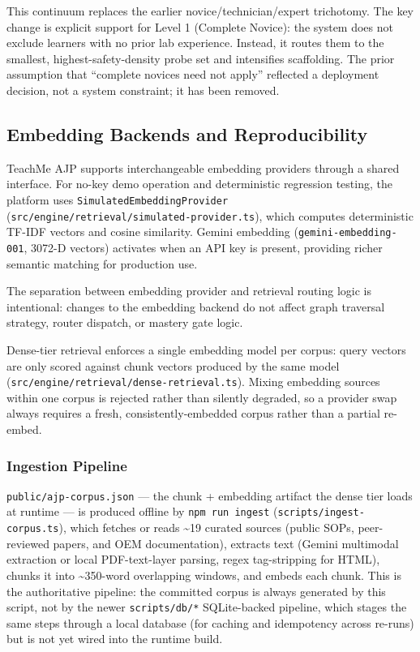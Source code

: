 \documentclass[10pt,letterpaper,twocolumn]{article}
\newcommand{\code}[1]{\texttt{\small #1}}
\begin{document}
This continuum replaces the earlier novice/technician/expert trichotomy. The key change is explicit support for Level 1 (Complete Novice): the system does not exclude learners with no prior lab experience. Instead, it routes them to the smallest, highest-safety-density probe set and intensifies scaffolding. The prior assumption that ``complete novices need not apply'' reflected a deployment decision, not a system constraint; it has been removed.

\subsection{Embedding Backends and Reproducibility}
\label{sec:embedding-backends}

TeachMe AJP supports interchangeable embedding providers through a shared interface. For no-key demo operation and deterministic regression testing, the platform uses \code{SimulatedEmbeddingProvider} (\code{src/\linebreak[0]engine/\linebreak[0]retrieval/\linebreak[0]simulated-provider.ts}), which computes deterministic TF-IDF vectors and cosine similarity. Gemini embedding (\code{gemini-embedding-001}, 3072-D vectors) activates when an API key is present, providing richer semantic matching for production use.

The separation between embedding provider and retrieval routing logic is intentional: changes to the embedding backend do not affect graph traversal strategy, router dispatch, or mastery gate logic.

Dense-tier retrieval enforces a single embedding model per corpus: query vectors are only scored against chunk vectors produced by the same model (\code{src/\linebreak[0]engine/\linebreak[0]retrieval/\linebreak[0]dense-retrieval.ts}). Mixing embedding sources within one corpus is rejected rather than silently degraded, so a provider swap always requires a fresh, consistently-embedded corpus rather than a partial re-embed.

\subsubsection{Ingestion Pipeline}
\label{sec:ingestion-pipeline}

\code{public/ajp-corpus.json} --- the chunk + embedding artifact the dense tier loads at runtime --- is produced offline by \code{npm run ingest} (\code{scripts/ingest-corpus.ts}), which fetches or reads \textasciitilde19 curated sources (public SOPs, peer-reviewed papers, and OEM documentation), extracts text (Gemini multimodal extraction or local PDF-text-layer parsing, regex tag-stripping for HTML), chunks it into \textasciitilde350-word overlapping windows, and embeds each chunk. This is the authoritative pipeline: the committed corpus is always generated by this script, not by the newer \code{scripts/db/*} SQLite-backed pipeline, which stages the same steps through a local database (for caching and idempotency across re-runs) but is not yet wired into the runtime build.
\end{document}
